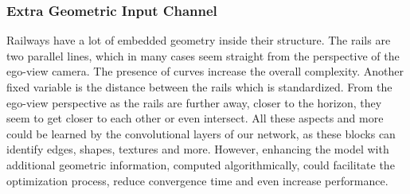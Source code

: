 \documentclass[conference]{IEEEtran}
\begin{document}


\subsubsection{Extra Geometric Input Channel}

Railways have a lot of embedded geometry inside their structure. The  rails are two parallel lines, which in many cases seem straight from the perspective of the ego-view camera. The presence of curves increase the overall complexity. Another fixed variable is the distance between the rails which is standardized. From the ego-view perspective as the rails are further away, closer to the horizon, they seem to get closer to each other or even intersect. All these aspects and more could be learned by the convolutional layers of our network, as these blocks can identify edges, shapes, textures and more. However, enhancing the model with additional geometric information, computed algorithmically, could facilitate the optimization process, reduce convergence time and even increase performance.
\end{document}
